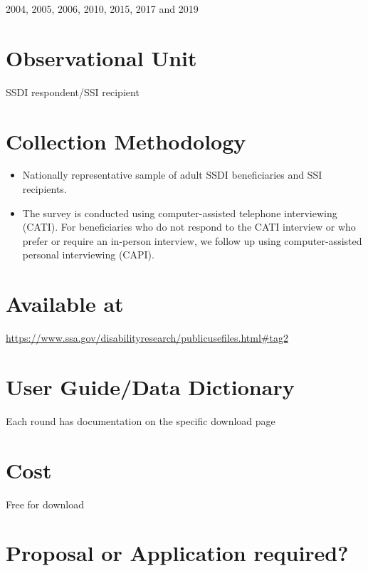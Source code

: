 \documentclass[
]{book}
\providecommand{\tightlist}{%
  \setlength{\itemsep}{0pt}\setlength{\parskip}{0pt}}
\begin{document}
2004, 2005, 2006, 2010, 2015, 2017 and 2019

\hypertarget{observational-unit-44}{%
\section{Observational Unit}\label{observational-unit-44}}

SSDI respondent/SSI recipient

\hypertarget{collection-methodology-44}{%
\section{Collection Methodology}\label{collection-methodology-44}}

\begin{itemize}
\tightlist
\item
  Nationally representative sample of adult SSDI beneficiaries and SSI recipients.
\item
  The survey is conducted using computer-assisted telephone interviewing (CATI). For beneficiaries who do not respond to the CATI interview or who prefer or require an in-person interview, we follow up using computer-assisted personal interviewing (CAPI).
\end{itemize}

\hypertarget{available-at-44}{%
\section{Available at}\label{available-at-44}}

\url{https://www.ssa.gov/disabilityresearch/publicusefiles.html\#tag2}

\hypertarget{user-guidedata-dictionary-44}{%
\section{User Guide/Data Dictionary}\label{user-guidedata-dictionary-44}}

Each round has documentation on the specific download page

\hypertarget{cost-44}{%
\section{Cost}\label{cost-44}}

Free for download

\hypertarget{proposal-or-application-required-44}{%
\section{Proposal or Application required?}\label{proposal-or-application-required-44}}
\end{document}

